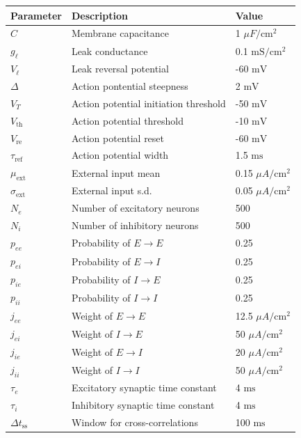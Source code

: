 \documentclass{ucetd}
\begin{document}
\clearpage
\begin{center}
    \begin{tabular}{ | p{4cm} p{7cm} p{4cm} |}
    \hline
    Parameter & Description & Value \\ \hline
    $C$ & Membrane capacitance & 1 $\mu F/\mathrm{cm}^{2}$ \\
    $g_{\ell}$ & Leak conductance & 0.1 $\mathrm{mS}/\mathrm{cm}^{2}$\\
    $V_{\ell}$ & Leak reversal potential & -60 $\mathrm{mV}$ \\
    $\Delta$ & Action pontential steepness & 2 $\mathrm{mV}$ \\
    $V_{T}$ & Action potential initiation threshold & -50 $\mathrm{mV}$ \\
    $V_{\mathrm{th}}$ & Action potential threshold & -10 $\mathrm{mV}$ \\
    $V_{\mathrm{re}}$ & Action potential reset & -60 $\mathrm{mV}$ \\
    $\tau_{\mathrm{ref}}$ & Action potential width & 1.5 $\mathrm{ms}$ \\
    $\mu_{\mathrm{ext}}$ & External input mean & 0.15 $\mu A/\mathrm{cm}^{2}$ \\
    $\sigma_{\mathrm{ext}}$ & External input s.d. & 0.05 $\mu A/\mathrm{cm}^{2}$ \\
    $N_{e}$ & Number of excitatory neurons & 500 \\
    $N_{i}$ & Number of inhibitory neurons & 500 \\
    $p_{ee}$ & Probability of $E\rightarrow E$ & 0.25 \\
    $p_{ei}$ & Probability of $E\rightarrow I$ & 0.25 \\
    $p_{ie}$ & Probability of $I\rightarrow E$ & 0.25 \\
    $p_{ii}$ & Probability of $I\rightarrow I$ & 0.25 \\
    $j_{ee}$ & Weight of $E\rightarrow E$ & 12.5 $\mu A/\mathrm{cm}^{2}$ \\
    $j_{ei}$ & Weight of $I\rightarrow E$ & 50 $\mu A/\mathrm{cm}^{2}$\\
    $j_{ie}$ & Weight of $E\rightarrow I$ & 20 $\mu A/\mathrm{cm}^{2}$ \\
    $j_{ii}$ & Weight of $I\rightarrow I$ & 50 $\mu A/\mathrm{cm}^{2}$\\
    $\tau_{e}$ & Excitatory synaptic time constant & 4 $\mathrm{ms}$\\
    $\tau_{i}$ & Inhibitory synaptic time constant & 4 $\mathrm{ms}$ \\
    $\Delta t_{\mathrm{ss}}$ & Window for cross-correlations & 100 $\mathrm{ms}$ \\
    \hline

    \end{tabular}
    
\end{center}
\end{document}
